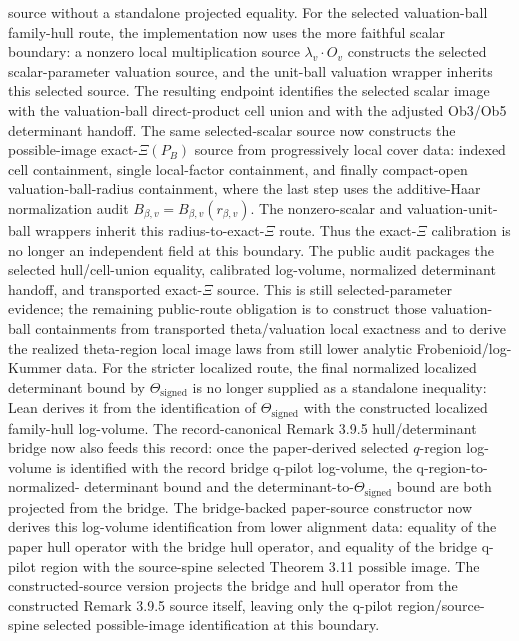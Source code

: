 \documentclass[11pt]{article}
\theoremstyle{plain}
\theoremstyle{definition}
\theoremstyle{remark}
\begin{document}
source without a standalone projected equality.
For the selected valuation-ball family-hull route, the implementation now
uses the more faithful scalar boundary: a nonzero local multiplication source
\(\lambda_v\cdot O_v\) constructs the selected scalar-parameter valuation
source, and the unit-ball valuation wrapper inherits this selected source.
The resulting endpoint identifies the selected scalar image with the
valuation-ball direct-product cell union and with the adjusted Ob3/Ob5
determinant handoff.  The same selected-scalar source now constructs the
possible-image exact-\(\Xi(P_B)\) source from progressively local cover data:
indexed cell containment, single local-factor containment, and finally
compact-open valuation-ball-radius containment, where the last step uses the
additive-Haar normalization audit
\(B_{\beta,v}=B_{\beta,v}(r_{\beta,v})\).  The nonzero-scalar and
valuation-unit-ball wrappers inherit this radius-to-exact-\(\Xi\) route.
Thus the exact-\(\Xi\) calibration is no longer an independent field at this
boundary.  The public audit packages the selected hull/cell-union equality,
calibrated log-volume, normalized determinant handoff, and transported
exact-\(\Xi\) source.  This is still selected-parameter evidence; the
remaining public-route obligation is to construct those valuation-ball
containments from transported theta/valuation local exactness and to derive
the realized theta-region local image laws from still lower analytic
Frobenioid/log-Kummer data.
For the stricter localized route, the final normalized localized determinant
bound by \(\Theta_{\mathrm{signed}}\) is no longer supplied as a standalone
inequality: Lean derives it from the identification of
\(\Theta_{\mathrm{signed}}\) with the constructed localized family-hull
log-volume.  The
record-canonical Remark 3.9.5 hull/determinant bridge now also feeds this
record: once the paper-derived selected \(q\)-region log-volume is identified
with the record bridge q-pilot log-volume, the q-region-to-normalized-
determinant bound and the determinant-to-\(\Theta_{\mathrm{signed}}\) bound
are both projected from the bridge.  The bridge-backed paper-source constructor
now derives this log-volume identification from lower alignment data: equality
of the paper hull operator with the bridge hull operator, and equality of the
bridge q-pilot region with the source-spine selected Theorem 3.11 possible
image.  The constructed-source version projects the bridge and hull operator
from the constructed Remark 3.9.5 source itself, leaving only the q-pilot
region/source-spine selected possible-image identification at this boundary.
\end{document}
